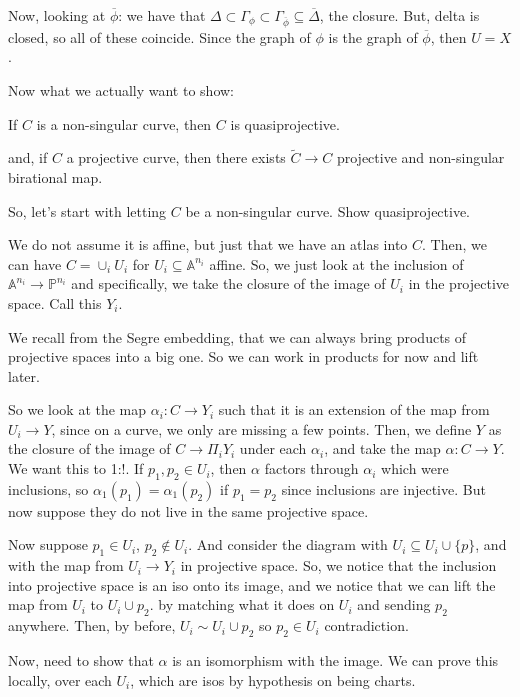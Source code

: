 \documentclass[10pt]{article}
\begin{document}
Now, looking at $\overline{\phi}$: we have that $\Delta \subset \Gamma_\phi \subset \Gamma_{\overline{\phi}} \subseteq \overline{\Delta}$, the closure. But, delta is closed, so all of these coincide. Since the graph of $\phi$ is the graph of $\overline{\phi}$, then $U = X$.

Now what we actually want to show:

If $C$ is a non-singular curve, then $C$ is quasiprojective.

and, if $C$ a projective curve, then there exists $\tilde{C} \to C$ projective and non-singular birational map.

So, let’s start with letting $C$ be a non-singular curve. Show quasiprojective.

We do not assume it is affine, but just that we have an atlas into $C$. Then, we can have $C = \cup_i U_i$ for $U_i \subseteq \mathbb{A}^{n_i}$ affine. So, we just look at the inclusion of $\mathbb{A}^{n_i} \to \mathbb{P}^{n_i}$ and specifically, we take the closure of the image of $U_i$ in the projective space. Call this $Y_i$.

We recall from the Segre embedding, that we can always bring products of projective spaces into a big one. So we can work in products for now and lift later.

So we look at the map $\alpha_i: C \to Y_i$ such that it is an extension of the map from $U_i \to Y$, since on a curve, we only are missing a few points. Then, we define $Y$ as the closure of the image of $C \to \Pi_i Y_i$ under each $\alpha_i$, and take the map $\alpha: C \to Y$. We want this to 1:!. If $p_1,p_2 \in U_i$, then $\alpha$ factors through $\alpha_i$ which were inclusions, so $\alpha_1(p_1) = \alpha_1(p_2)$ if $p_1 = p_2$ since inclusions are injective. But now suppose they do not live in the same projective space.

Now suppose $p_1 \in U_i$, $p_2 \not \in U_i$. And consider the diagram with $U_i \subseteq U_i \cup \{ p \}$, and with the map from $U_i \to Y_i$ in projective space. So, we notice that the inclusion into projective space is an iso onto its image, and we notice that we can lift the map from $U_i$ to $U_i \cup p_2$. by matching what it does on $U_i$ and sending $p_2$ anywhere. Then, by before, $U_i \sim U_i \cup p_2$ so $p_2 \in U_i$ contradiction.

Now, need to show that $\alpha$ is an isomorphism with the image. We can prove this locally, over each $U_i$, which are isos by hypothesis on being charts.
\end{document}
